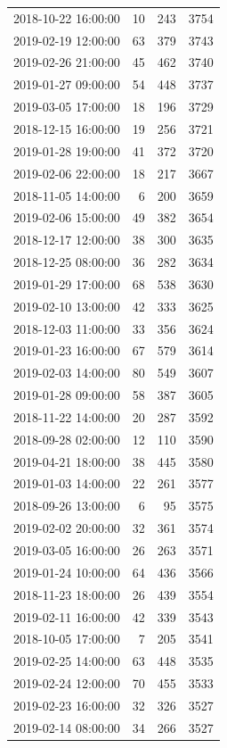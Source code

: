 \begin{tabular}{lrrr}
2018-10-22 16:00:00 & 10 & 243 & 3754 \\
2019-02-19 12:00:00 & 63 & 379 & 3743 \\
2019-02-26 21:00:00 & 45 & 462 & 3740 \\
2019-01-27 09:00:00 & 54 & 448 & 3737 \\
2019-03-05 17:00:00 & 18 & 196 & 3729 \\
2018-12-15 16:00:00 & 19 & 256 & 3721 \\
2019-01-28 19:00:00 & 41 & 372 & 3720 \\
2019-02-06 22:00:00 & 18 & 217 & 3667 \\
2018-11-05 14:00:00 & 6 & 200 & 3659 \\
2019-02-06 15:00:00 & 49 & 382 & 3654 \\
2018-12-17 12:00:00 & 38 & 300 & 3635 \\
2018-12-25 08:00:00 & 36 & 282 & 3634 \\
2019-01-29 17:00:00 & 68 & 538 & 3630 \\
2019-02-10 13:00:00 & 42 & 333 & 3625 \\
2018-12-03 11:00:00 & 33 & 356 & 3624 \\
2019-01-23 16:00:00 & 67 & 579 & 3614 \\
2019-02-03 14:00:00 & 80 & 549 & 3607 \\
2019-01-28 09:00:00 & 58 & 387 & 3605 \\
2018-11-22 14:00:00 & 20 & 287 & 3592 \\
2018-09-28 02:00:00 & 12 & 110 & 3590 \\
2019-04-21 18:00:00 & 38 & 445 & 3580 \\
2019-01-03 14:00:00 & 22 & 261 & 3577 \\
2018-09-26 13:00:00 & 6 & 95 & 3575 \\
2019-02-02 20:00:00 & 32 & 361 & 3574 \\
2019-03-05 16:00:00 & 26 & 263 & 3571 \\
2019-01-24 10:00:00 & 64 & 436 & 3566 \\
2018-11-23 18:00:00 & 26 & 439 & 3554 \\
2019-02-11 16:00:00 & 42 & 339 & 3543 \\
2018-10-05 17:00:00 & 7 & 205 & 3541 \\
2019-02-25 14:00:00 & 63 & 448 & 3535 \\
2019-02-24 12:00:00 & 70 & 455 & 3533 \\
2019-02-23 16:00:00 & 32 & 326 & 3527 \\
2019-02-14 08:00:00 & 34 & 266 & 3527 \\

\end{tabular}
